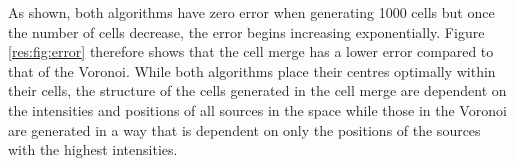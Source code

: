 As shown, both algorithms have zero error when generating 1000 cells but once the number of cells decrease, the error begins increasing exponentially. Figure \ref{res:fig:error} therefore shows that the cell merge has a lower error compared to that of the Voronoi. While both algorithms place their centres optimally within their cells, the structure of the cells generated in the cell merge are dependent on the intensities and positions of all sources in the space while those in the Voronoi are generated in a way that is dependent on only the positions of the sources with the highest intensities.